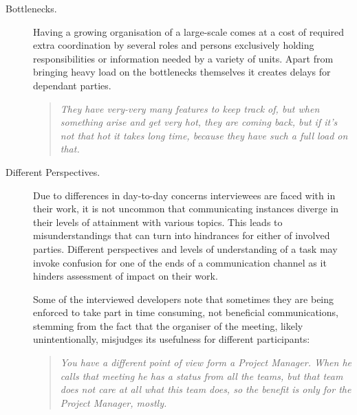 \begin{description}

   \item[Bottlenecks.] Having a growing organisation of a large-scale comes at a cost of required extra coordination by several roles and persons exclusively holding responsibilities or information needed by a variety of units. Apart from bringing heavy load on the bottlenecks themselves it creates delays for dependant parties.
   
      \begin{quote}\itshape They have very-very many features to keep track of, but when something arise and get very hot, they are coming back, but if it's not that hot it takes long time, because they have such a full load on that.
      \end{quote}

   \item[Different Perspectives.] Due to differences in day-to-day concerns interviewees are faced with in their work, it is not uncommon that communicating instances diverge in their levels of attainment with various topics. This leads to misunderstandings that can turn into hindrances for either of involved parties. Different perspectives and levels of understanding of a task may invoke confusion for one of the ends of a communication channel as it hinders assessment of impact on their work.

      
   Some of the interviewed developers note that sometimes they are being enforced to take part in time consuming, not beneficial communications, stemming from the fact that the organiser of the meeting, likely unintentionally, misjudges its usefulness for different participants:

      \begin{quote}\itshape You have a different point of view form a Project Manager. When he calls that meeting he has a status from all the teams, but that team does not care at all what this team does, so the benefit is only for the Project Manager, mostly.
      \end{quote}


\end{description}
